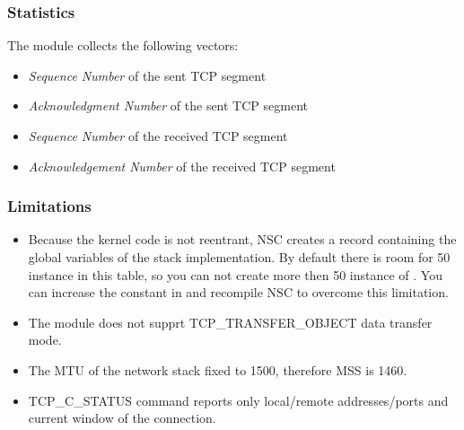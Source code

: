 \subsubsection*{Statistics}

The  module collects the following vectors:

\begin{itemize}
  \item {} \emph{Sequence Number} of the sent TCP segment
  \item {} \emph{Acknowledgment Number} of the sent TCP segment
  \item {} \emph{Sequence Number} of the received TCP segment
  \item {} \emph{Acknowledgement Number} of the received TCP segment
\end{itemize}

\subsubsection*{Limitations}

\begin{itemize}
\item Because the kernel code is not reentrant, NSC creates a record containing
the global variables of the stack implementation. By default there is room
for 50 instance in this table, so you can not create more then 50 instance
of . You can increase the  constant
in  and recompile NSC to overcome this limitation.

\item The  module does not supprt TCP\_TRANSFER\_OBJECT
data transfer mode.

\item The MTU of the network stack fixed to 1500, therefore MSS is 1460.

\item TCP\_C\_STATUS command reports only local/remote addresses/ports and
      current window of the connection.

\end{itemize}






